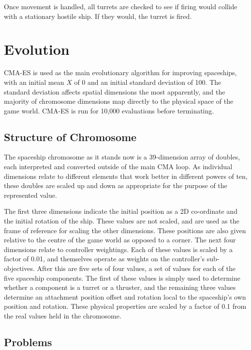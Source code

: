 \documentclass[a4paper]{article}
\begin{document}
Once movement is handled, all turrets are checked to see if firing would collide with a stationary hostile ship. If they would, the turret is fired.

\section{Evolution}

CMA-ES is used as the main evolutionary algorithm for improving spaceships, with an initial mean $X$ of 0 and an initial standard deviation of 100. The standard deviation affects spatial dimensions the most apparently, and the majority of chromosome dimensions map directly to the physical space of the game world. CMA-ES is run for 10,000 evaluations before terminating.

\subsection{Structure of Chromosome}

The spaceship chromosome as it stands now is a 39-dimension array of doubles, each interpreted and converted outside of the main CMA loop. As individual dimensions relate to different elements that work better in different powers of ten, these doubles are scaled up and down as appropriate for the purpose of the represented value.

The first three dimensions indicate the initial position as a 2D co-ordinate and the initial rotation of the ship. These values are not scaled, and are used as the frame of reference for scaling the other dimensions. These positions are also given relative to the centre of the game world as opposed to a corner. The next four dimensions relate to controller weightings. Each of these values is scaled by a factor of 0.01, and themselves operate as weights on the controller's sub-objectives. After this are five sets of four values, a set of values for each of the five spaceship components. The first of these values is simply used to determine whether a component is a turret or a thruster, and the remaining three values determine an attachment position offset and rotation local to the spaceship's own position and rotation. These physical properties are scaled by a factor of 0.1 from the real values held in the chromosome.

\subsection{Problems}
\end{document}

